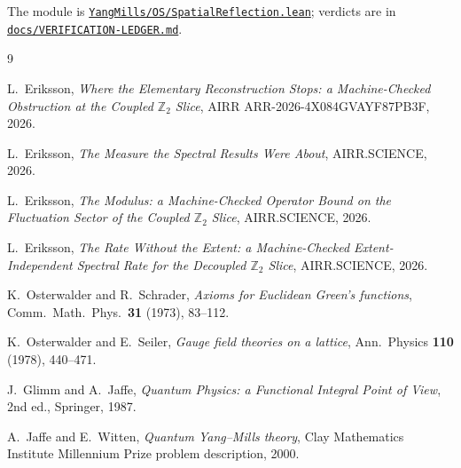 \documentclass[11pt]{article}
\theoremstyle{definition}
\newcommand{\anchor}{854ff223396630a8a75b0a95a3ada6413f3a395d}
\newcommand{\repofile}[2]{%
  \href{https://github.com/lluiseriksson/THE-ERIKSSON-PROGRAMME/blob/\anchor/#1}{\nolinkurl{#2}}}
\newcommand{\Z}{\mathbb{Z}}
\begin{document}
The module is
\repofile{YangMills/OS/SpatialReflection.lean}{YangMills/OS/SpatialReflection.lean};
verdicts are in
\repofile{docs/VERIFICATION-LEDGER.md}{docs/VERIFICATION-LEDGER.md}.

\begin{thebibliography}{9}

L.~Eriksson,
\emph{Where the Elementary Reconstruction Stops: a Machine-Checked Obstruction
at the Coupled $\Z_2$ Slice}, AIRR ARR-2026-4X084GVAYF87PB3F, 2026.

L.~Eriksson,
\emph{The Measure the Spectral Results Were About}, AIRR.SCIENCE, 2026.

L.~Eriksson,
\emph{The Modulus: a Machine-Checked Operator Bound on the Fluctuation Sector of
the Coupled $\Z_2$ Slice}, AIRR.SCIENCE, 2026.

L.~Eriksson,
\emph{The Rate Without the Extent: a Machine-Checked Extent-Independent Spectral
Rate for the Decoupled $\Z_2$ Slice}, AIRR.SCIENCE, 2026.

K.~Osterwalder and R.~Schrader,
\emph{Axioms for Euclidean Green's functions}, Comm.\ Math.\ Phys.\
\textbf{31} (1973), 83--112.

K.~Osterwalder and E.~Seiler,
\emph{Gauge field theories on a lattice}, Ann.\ Physics \textbf{110} (1978),
440--471.

J.~Glimm and A.~Jaffe,
\emph{Quantum Physics: a Functional Integral Point of View}, 2nd ed.,
Springer, 1987.

A.~Jaffe and E.~Witten,
\emph{Quantum Yang--Mills theory}, Clay Mathematics Institute Millennium Prize
problem description, 2000.

\end{thebibliography}
\end{document}
